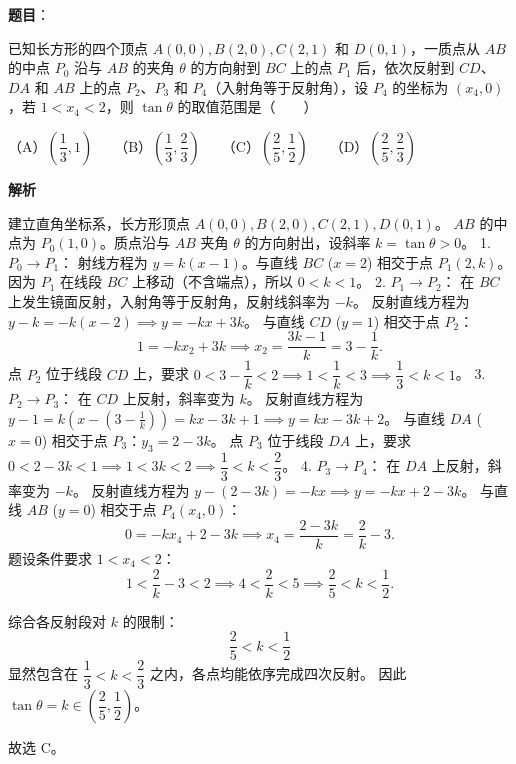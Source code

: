 \begin{answer}

\textbf{题目}：

已知长方形的四个顶点 $A(0, 0), B(2, 0), C(2, 1)$ 和 $D(0, 1)$，一质点从 $AB$ 的中点 $P_0$ 沿与 $AB$ 的夹角 $\theta$ 的方向射到 $BC$ 上的点 $P_1$ 后，依次反射到 $CD$、$DA$ 和 $AB$ 上的点 $P_2$、$P_3$ 和 $P_4$（入射角等于反射角），设 $P_4$ 的坐标为 $(x_4, 0)$，若 $1 < x_4 < 2$，则 $\tan\theta$ 的取值范围是\mbox{（　　）}

（A）$\left(\dfrac{1}{3}, 1\right)$　　（B）$\left(\dfrac{1}{3}, \dfrac{2}{3}\right)$　　（C）$\left(\dfrac{2}{5}, \dfrac{1}{2}\right)$　　（D）$\left(\dfrac{2}{5}, \dfrac{2}{3}\right)$

\textbf{解析}

建立直角坐标系，长方形顶点 $A(0, 0), B(2, 0), C(2, 1), D(0, 1)$。
$AB$ 的中点为 $P_0(1, 0)$。质点沿与 $AB$ 夹角 $\theta$ 的方向射出，设斜率 $k = \tan\theta > 0$。
1. \textbf{$P_0 \to P_1$}：
   射线方程为 $y = k(x - 1)$。与直线 $BC$ ($x = 2$) 相交于点 $P_1(2, k)$。
   因为 $P_1$ 在线段 $BC$ 上移动（不含端点），所以 $0 < k < 1$。
2. \textbf{$P_1 \to P_2$}：
   在 $BC$ 上发生镜面反射，入射角等于反射角，反射线斜率为 $-k$。
   反射直线方程为 $y - k = -k(x - 2) \implies y = -kx + 3k$。
   与直线 $CD$ ($y = 1$) 相交于点 $P_2$：
\nopagebreak[4]
\[1 = -kx_2 + 3k \implies x_2 = \frac{3k - 1}{k} = 3 - \frac{1}{k}.\]
   点 $P_2$ 位于线段 $CD$ 上，要求 $0 < 3 - \dfrac{1}{k} < 2 \implies 1 < \dfrac{1}{k} < 3 \implies \dfrac{1}{3} < k < 1$。
3. \textbf{$P_2 \to P_3$}：
   在 $CD$ 上反射，斜率变为 $k$。
   反射直线方程为 $y - 1 = k\left(x - \left(3 - \frac{1}{k}\right)\right) = kx - 3k + 1 \implies y = kx - 3k + 2$。
   与直线 $DA$ ($x = 0$) 相交于点 $P_3$：$y_3 = 2 - 3k$。
   点 $P_3$ 位于线段 $DA$ 上，要求 $0 < 2 - 3k < 1 \implies 1 < 3k < 2 \implies \dfrac{1}{3} < k < \dfrac{2}{3}$。
4. \textbf{$P_3 \to P_4$}：
   在 $DA$ 上反射，斜率变为 $-k$。
   反射直线方程为 $y - (2 - 3k) = -kx \implies y = -kx + 2 - 3k$。
   与直线 $AB$ ($y = 0$) 相交于点 $P_4(x_4, 0)$：
\nopagebreak[4]
\[0 = -kx_4 + 2 - 3k \implies x_4 = \frac{2 - 3k}{k} = \frac{2}{k} - 3.\]
   题设条件要求 $1 < x_4 < 2$：
\nopagebreak[4]
\[1 < \frac{2}{k} - 3 < 2 \implies 4 < \frac{2}{k} < 5 \implies \frac{2}{5} < k < \frac{1}{2}.\]

综合各反射段对 $k$ 的限制：
\nopagebreak[4]
\[\frac{2}{5} < k < \frac{1}{2}\]
显然包含在 $\dfrac{1}{3} < k < \dfrac{2}{3}$ 之内，各点均能依序完成四次反射。
因此 $\tan\theta = k \in \left(\dfrac{2}{5}, \dfrac{1}{2}\right)$。

故选 C。


\end{answer}

